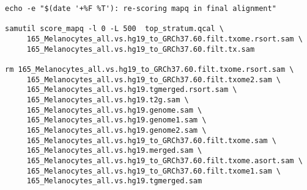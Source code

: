 \documentclass[10pt]{article}
\begin{document}
{\begin{verbatim}
echo -e "$(date '+%F %T'): re-scoring mapq in final alignment"

samutil score_mapq -l 0 -L 500  top_stratum.qcal \
     165_Melanocytes_all.vs.hg19_to_GRCh37.60.filt.txome.rsort.sam \
     165_Melanocytes_all.vs.hg19_to_GRCh37.60.filt.tx.sam

rm 165_Melanocytes_all.vs.hg19_to_GRCh37.60.filt.txome.rsort.sam \
     165_Melanocytes_all.vs.hg19_to_GRCh37.60.filt.txome2.sam \
     165_Melanocytes_all.vs.hg19.tgmerged.rsort.sam \
     165_Melanocytes_all.vs.hg19.t2g.sam \
     165_Melanocytes_all.vs.hg19.genome.sam \
     165_Melanocytes_all.vs.hg19.genome1.sam \
     165_Melanocytes_all.vs.hg19.genome2.sam \
     165_Melanocytes_all.vs.hg19_to_GRCh37.60.filt.txome.sam \
     165_Melanocytes_all.vs.hg19.merged.sam \
     165_Melanocytes_all.vs.hg19_to_GRCh37.60.filt.txome.asort.sam \
     165_Melanocytes_all.vs.hg19_to_GRCh37.60.filt.txome1.sam \
     165_Melanocytes_all.vs.hg19.tgmerged.sam
\end{verbatim}
}
\end{document}
